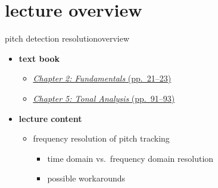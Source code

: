 

\subtitle{Part 6.3: Frequency Resolution of Pitch Tracking Solutions}


	

    \section[overview]{lecture overview}
        \begin{frame}{pitch detection resolution}{overview}
            \begin{itemize}
                \item   \textbf{text book}  
                    \begin{itemize}
                        \item   \href{http://ieeexplore.ieee.org/xpl/articleDetails.jsp?tp=&arnumber=6331119&}{\underline{\textit{Chapter 2: Fundamentals} (pp.~21--23)}}
                        \item   \href{http://ieeexplore.ieee.org/xpl/articleDetails.jsp?tp=&arnumber=6331122&}{\underline{\textit{Chapter 5: Tonal Analysis} (pp.~91--93)}}
                    \end{itemize}
                \bigskip
                \item<2->   \textbf{lecture content}
                    \begin{itemize}
                        \item<2->   frequency resolution of pitch tracking
                            \begin{itemize}
                                \item   time domain vs.\ frequency domain resolution
                                \item   possible workarounds
                            \end{itemize}
                    \end{itemize}
            \end{itemize}
        \end{frame}

